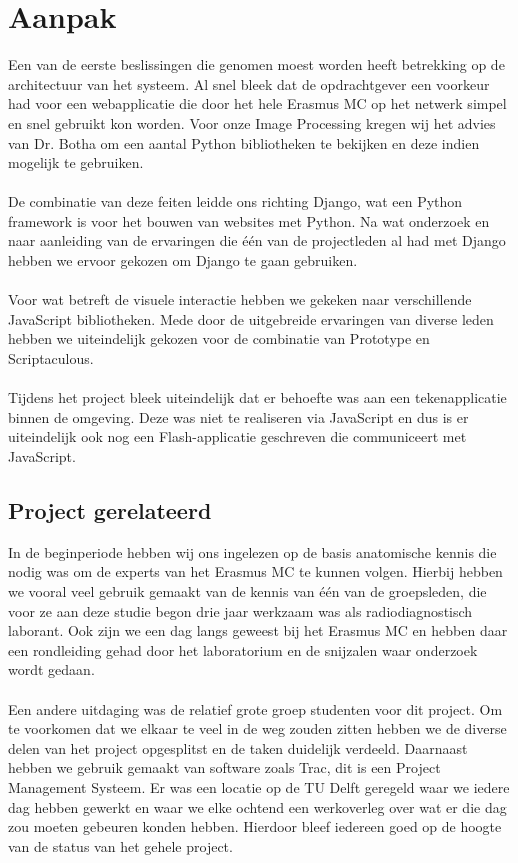 \section{Aanpak}
\label{Aanpak}
Een van de eerste beslissingen die genomen moest worden heeft betrekking op de architectuur van het systeem. 
Al snel bleek dat de opdrachtgever een voorkeur had voor een webapplicatie die door het hele Erasmus MC op het netwerk simpel en snel gebruikt kon worden. 
Voor onze Image Processing kregen wij het advies van Dr. Botha om een aantal Python bibliotheken te bekijken en deze indien mogelijk te gebruiken. 
\\
\\
De combinatie van deze feiten leidde ons richting Django, wat een Python framework is voor het bouwen van websites met Python. 
Na wat onderzoek en naar aanleiding van de ervaringen die \'{e}\'{e}n van de projectleden al had met Django hebben we ervoor gekozen om Django te gaan gebruiken. 
\\
\\
Voor wat betreft de visuele interactie hebben we gekeken naar verschillende JavaScript bibliotheken. Mede door de uitgebreide ervaringen van diverse leden hebben we uiteindelijk gekozen voor de combinatie van Prototype en Scriptaculous.
\\
\\
Tijdens het project bleek uiteindelijk dat er behoefte was aan een tekenapplicatie binnen de omgeving. Deze was niet te realiseren via JavaScript en dus is er uiteindelijk ook nog een Flash-applicatie geschreven die communiceert met JavaScript.

\subsection{Project gerelateerd}
\label{aanpak_project_gerelateerd}
In de beginperiode hebben wij ons ingelezen op de basis anatomische kennis die nodig was om de experts van het Erasmus MC te kunnen volgen.
Hierbij hebben we vooral veel gebruik gemaakt van de kennis van \'{e}\'{e}n van de groepsleden, die voor ze aan deze studie begon drie jaar werkzaam was als radiodiagnostisch laborant. Ook zijn we een dag langs geweest bij het Erasmus MC en hebben daar een rondleiding gehad door het laboratorium en de snijzalen waar onderzoek wordt gedaan. 
\\
\\
Een andere uitdaging was de relatief grote groep studenten voor dit project. 
Om te voorkomen dat we elkaar te veel in de weg zouden zitten hebben we de diverse delen van het project opgesplitst en de taken duidelijk verdeeld. 
Daarnaast hebben we gebruik gemaakt van software zoals Trac, dit is een Project Management Systeem. 
Er was een locatie op de TU Delft geregeld waar we iedere dag hebben gewerkt en waar we elke ochtend een werkoverleg over wat er die dag zou moeten gebeuren konden hebben. 
Hierdoor bleef iedereen goed op de hoogte van de status van het gehele project.

